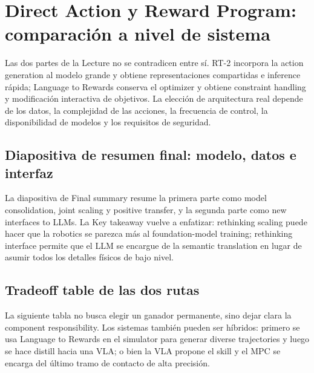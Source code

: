 \section{Direct Action y Reward Program: comparación a nivel de sistema}

Las dos partes de la Lecture no se contradicen entre sí. RT-2 incorpora la action generation al modelo grande y obtiene representaciones compartidas e inference rápida; Language to Rewards conserva el optimizer y obtiene constraint handling y modificación interactiva de objetivos. La elección de arquitectura real depende de los datos, la complejidad de las acciones, la frecuencia de control, la disponibilidad de modelos y los requisitos de seguridad.

\subsection{Diapositiva de resumen final: modelo, datos e interfaz}

La diapositiva de Final summary resume la primera parte como model consolidation, joint scaling y positive transfer, y la segunda parte como new interfaces to LLMs. La Key takeaway vuelve a enfatizar: rethinking scaling puede hacer que la robotics se parezca más al foundation-model training; rethinking interface permite que el LLM se encargue de la semantic translation en lugar de asumir todos los detalles físicos de bajo nivel.



\subsection{Tradeoff table de las dos rutas}

La siguiente tabla no busca elegir un ganador permanente, sino dejar clara la component responsibility. Los sistemas también pueden ser híbridos: primero se usa Language to Rewards en el simulator para generar diverse trajectories y luego se hace distill hacia una VLA; o bien la VLA propone el skill y el MPC se encarga del último tramo de contacto de alta precisión.

